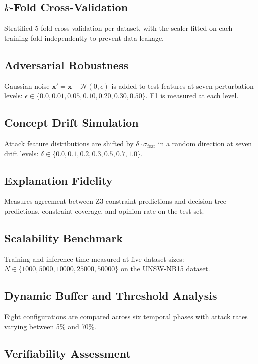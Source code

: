 \documentclass[12pt, letterpaper, oneside]{report}
\newcommand{\bx}{\mathbf{x}}
\begin{document}
\subsection{$k$-Fold Cross-Validation}

Stratified 5-fold cross-validation per dataset, with the scaler fitted on each training fold independently to prevent data leakage.

\subsection{Adversarial Robustness}

Gaussian noise $\bx' = \bx + \mathcal{N}(0, \epsilon)$ is added to test features at seven perturbation levels: $\epsilon \in \{0.0, 0.01, 0.05, 0.10, 0.20, 0.30, 0.50\}$. F1 is measured at each level.

\subsection{Concept Drift Simulation}

Attack feature distributions are shifted by $\delta \cdot \sigma_{\text{feat}}$ in a random direction at seven drift levels: $\delta \in \{0.0, 0.1, 0.2, 0.3, 0.5, 0.7, 1.0\}$.

\subsection{Explanation Fidelity}

Measures agreement between Z3 constraint predictions and decision tree predictions, constraint coverage, and opinion rate on the test set.

\subsection{Scalability Benchmark}

Training and inference time measured at five dataset sizes: $N \in \{1000, 5000, 10000, 25000, 50000\}$ on the UNSW-NB15 dataset.

\subsection{Dynamic Buffer and Threshold Analysis}

Eight configurations are compared across six temporal phases with attack rates varying between 5\% and 70\%.

\subsection{Verifiability Assessment}
\end{document}
